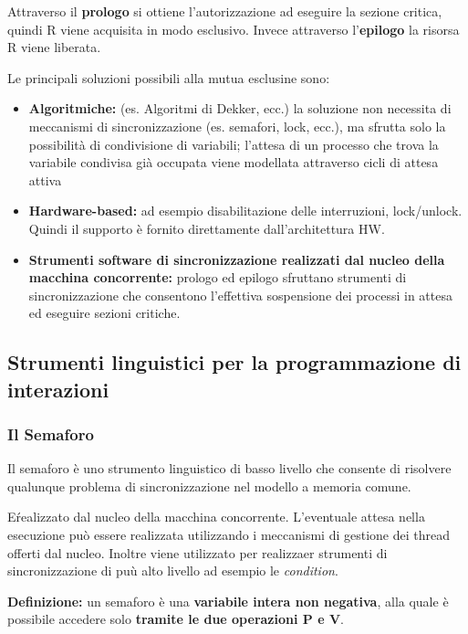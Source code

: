 \documentclass{article}
\begin{document}
Attraverso il \textbf{prologo} si ottiene l'autorizzazione ad eseguire la sezione critica, quindi R viene acquisita in modo esclusivo. Invece attraverso l'\textbf{epilogo}
la risorsa R viene liberata.

\vspace{5mm}
Le principali soluzioni possibili alla mutua esclusine sono:
\begin{itemize}
    \item \textbf{Algoritmiche:} (es. Algoritmi di Dekker, ecc.) la soluzione non necessita di meccanismi di sincronizzazione (es. semafori, lock, ecc.), ma sfrutta
    solo la possibilità di condivisione di variabili; l'attesa di un processo che trova la variabile condivisa già occupata viene modellata attraverso cicli di attesa attiva
    \item \textbf{Hardware-based:} ad esempio disabilitazione delle interruzioni, lock/unlock. Quindi il supporto è fornito direttamente dall'architettura HW.
    \item \textbf{Strumenti software di sincronizzazione realizzati dal nucleo della macchina concorrente:} prologo ed epilogo sfruttano strumenti di sincronizzazione
    che consentono l'effettiva sospensione dei processi in attesa ed eseguire sezioni critiche.
\end{itemize}

\subsection{Strumenti linguistici per la programmazione di interazioni}
\subsubsection{Il Semaforo}

Il semaforo è uno strumento linguistico di basso livello che consente di risolvere qualunque problema di sincronizzazione nel modello a memoria comune.

E\' realizzato dal nucleo della macchina concorrente. L'eventuale attesa nella esecuzione può essere realizzata utilizzando i meccanismi di gestione dei thread offerti
dal nucleo. Inoltre viene utilizzato per realizzaer strumenti di sincronizzazione di puù alto livello ad esempio le \textit{condition}.

\vspace{3mm}
\textbf{Definizione:} un semaforo è una \textbf{variabile intera non negativa}, alla quale è possibile accedere solo \textbf{tramite le due operazioni P e V}.
\vspace{3mm}
\end{document}
